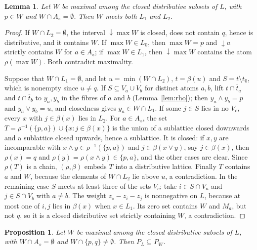 \documentclass{amsart}
\newtheorem{lemma}[theorem]{Lemma}
\newtheorem{proposition}[theorem]{Proposition}
\theoremstyle{definition}
\newcommand{\dm}{\diamond}
\newcommand{\ut}{\overline{t}}
\begin{document}
\begin{lemma}\label{lem:alphalevels}
Let $W$ be maximal among the closed distributive subsets of $L$, with $p\in W$ and $W\cap A_\dm=\emptyset$. Then $W$ meets both $L_1$ and $L_2$.
\end{lemma}

\begin{proof}
If $W\cap L_2=\emptyset$, the interval ${\downarrow}\max W$ is closed, does not contain $q$, hence is distributive, and it contains $W$. If $\max W\in L_0$, then $\max W=p$ and ${\downarrow}a$ strictly contains $W$ for $a\in A_\dm$; if $\max W\in L_1$, then ${\downarrow}\max W$ contains the atom $\rho(\max W)$. Both contradict maximality.

Suppose that $W\cap L_1=\emptyset$, and let $u=\min(W\cap L_2)$, $t=\beta(u)$ and $S=t\setminus t_0$, which is nonempty since $u\ne q$. If $S\subseteq V_a\cup V_b$ for distinct atoms $a,b$, lift $t\cap\ut_a$ and $t\cap\ut_b$ to $y_a,y_b$ in the fibres of $a$ and $b$ (Lemma~\ref{lem:rho}); then $y_a\wedge y_b=p$ and $y_a\vee y_b=u$, and closedness gives $y_a\in W\cap L_1$. If some $j\in S$ lies in no $V_c$, every $x$ with $j\in\beta(x)$ lies in $L_2$. For $a\in A_\dm$, the set $T=\rho^{-1}(\{p,a\})\cup\{x:j\in\beta(x)\}$ is the union of a sublattice closed downwards and a sublattice closed upwards, hence a sublattice. It is closed: if $x,y$ are incomparable with $x\wedge y\in\rho^{-1}(\{p,a\})$ and $j\in\beta(x\vee y)$, say $j\in\beta(x)$, then $\rho(x)=q$ and $\rho(y)=\rho(x\wedge y)\in\{p,a\}$, and the other cases are clear. Since $\rho(T)$ is a chain, $(\rho,\beta)$ embeds $T$ into a distributive lattice. Finally $T$ contains $a$ and $W$, because the elements of $W\cap L_2$ lie above $u$, a contradiction. In the remaining case $S$ meets at least three of the sets $V_c$; take $i\in S\cap V_a$ and $j\in S\cap V_b$ with $a\ne b$. The weight $z_\dm-z_i-z_j$ is nonnegative on $L$, because at most one of $i,j$ lies in $\beta(x)$ when $x\in L_1$. Its zero set contains $W$ and $M_a$, but not $q$, so it is a closed distributive set strictly containing $W$, a contradiction.
\end{proof}

\begin{proposition}\label{prop:endpoint}
Let $W$ be maximal among the closed distributive subsets of $L$, with $W\cap A_\dm=\emptyset$ and $W\cap\{p,q\}\ne\emptyset$. Then $P_L\subseteq P_W$.
\end{proposition}
\end{document}
